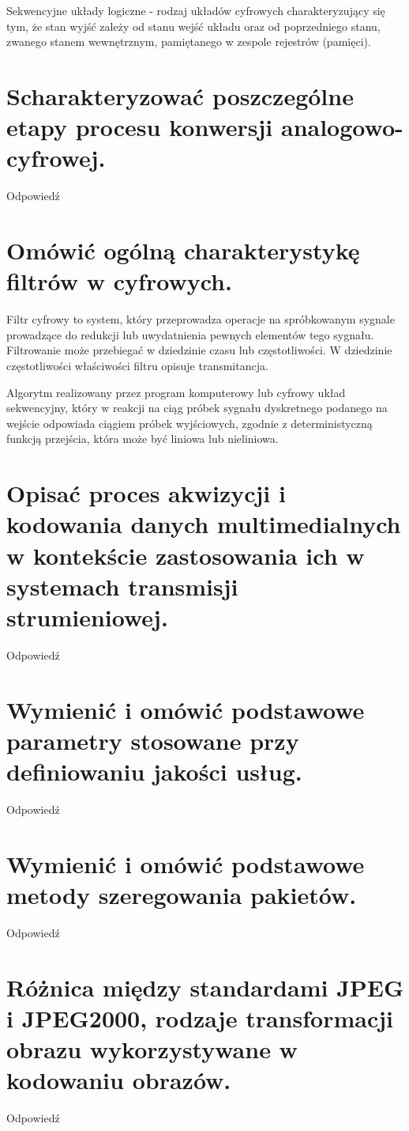 \documentclass[12pt,a4paper]{article}
\begin{document}
	Sekwencyjne układy logiczne - rodzaj układów cyfrowych charakteryzujący się tym, że stan wyjść zależy od stanu wejść układu oraz od poprzedniego stanu, zwanego stanem wewnętrznym, pamiętanego w zespole rejestrów (pamięci).

	\section{Scharakteryzować poszczególne etapy procesu konwersji analogowo-cyfrowej.}
	Odpowiedź

	\section{Omówić ogólną charakterystykę filtrów w cyfrowych.}
	Filtr cyfrowy to system, który przeprowadza operacje na spróbkowanym sygnale prowadzące do redukcji lub uwydatnienia pewnych elementów tego sygnału. Filtrowanie może przebiegać w dziedzinie czasu lub częstotliwości. W dziedzinie częstotliwości właściwości filtru opisuje transmitancja.

	Algorytm realizowany przez program komputerowy lub cyfrowy układ sekwencyjny, który w reakcji na ciąg próbek sygnału dyskretnego podanego na wejście odpowiada ciągiem próbek wyjściowych, zgodnie z deterministyczną funkcją przejścia, która może być liniowa lub nieliniowa.


	\section{Opisać proces akwizycji i kodowania danych multimedialnych w kontekście zastosowania ich w systemach transmisji strumieniowej.}
	Odpowiedź

	\section{Wymienić i omówić podstawowe parametry stosowane przy definiowaniu jakości usług.}
	Odpowiedź

	\section{Wymienić i omówić podstawowe metody szeregowania pakietów.}
	Odpowiedź

	\section{Różnica między standardami JPEG i JPEG2000, rodzaje transformacji obrazu wykorzystywane w kodowaniu obrazów.}
	Odpowiedź
\end{document}
